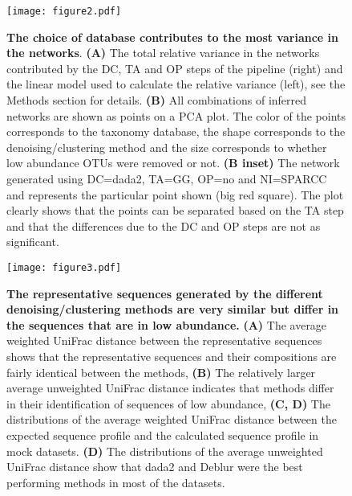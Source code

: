  \begin{figure}[H]
    \centering
    \texttt{[image: figure2.pdf]}
  \end{figure}
  \begin{figure}[H]
    \centering
      \caption{
      \textbf{The choice of database contributes to the most variance in the networks}.
      \textbf{(A)} The total relative variance in the networks contributed by the DC, TA and OP steps of the pipeline (right) and the linear model used to calculate the relative variance (left), see the Methods section for details.
      \textbf{(B)} All combinations of inferred networks are shown as points on a PCA plot.
      The color of the points corresponds to the taxonomy database, the shape corresponds to the denoising/clustering method and the size corresponds to whether low abundance OTUs were removed or not.
      \textbf{(B inset)} The network generated using DC=dada2, TA=GG, OP=no and NI=SPARCC and represents the particular point shown (big red square).
      The plot clearly shows that the points can be separated based on the TA step and that the differences due to the DC and OP steps are not as significant.
    }
    \label{fig:figure2}
  \end{figure}
  \FloatBarrier
  \newpage
  
  \begin{figure}
    \centering
    \texttt{[image: figure3.pdf]}
    \caption{
      \textbf{The representative sequences generated by the different denoising/clustering methods are very similar but differ in the sequences that are in low abundance.}
      \textbf{(A)} The average weighted UniFrac distance between the representative sequences shows that the representative sequences and their compositions are fairly identical between the methods,
      \textbf{(B)} The relatively larger average unweighted UniFrac distance indicates that methods differ in their identification of sequences of low abundance,
      \textbf{(C, D)} The distributions of the average weighted UniFrac distance between the expected sequence profile and the calculated sequence profile in mock datasets.
      \textbf{(D)} The distributions of the average unweighted UniFrac distance show that dada2 and Deblur were the best performing methods in most of the datasets.
    }
    \label{fig:figure3}
  \end{figure}
  \FloatBarrier
  \newpage
  
